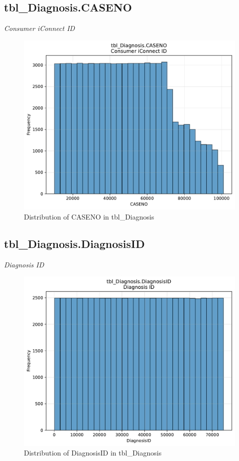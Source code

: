 \subsection{tbl\_Diagnosis.CASENO}
\textit{Consumer iConnect ID}

\begin{figure}[htbp]
\centering
\includegraphics[width=\textwidth]{figures/dbo_tbl_Diagnosis_CASENO.pdf}
\caption{Distribution of CASENO in tbl\_Diagnosis}
\end{figure}\newpage

\subsection{tbl\_Diagnosis.DiagnosisID}
\textit{Diagnosis ID}

\begin{figure}[htbp]
\centering
\includegraphics[width=\textwidth]{figures/dbo_tbl_Diagnosis_DiagnosisID.pdf}
\caption{Distribution of DiagnosisID in tbl\_Diagnosis}
\end{figure}\newpage

